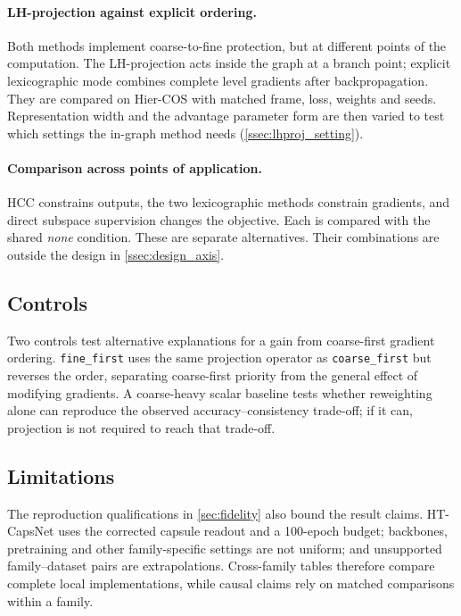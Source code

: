 \paragraph{LH-projection against explicit ordering.} Both methods implement
coarse-to-fine protection, but at different points of the computation. The
LH-projection acts inside the graph at a branch point; explicit lexicographic
mode combines complete level gradients after backpropagation. They are compared
on Hier-COS with matched frame, loss, weights and seeds. Representation width
and the advantage parameter form are then varied to test which settings the
in-graph method needs (\cref{ssec:lhproj_setting}).

\paragraph{Comparison across points of application.} HCC constrains outputs, the
two lexicographic methods constrain gradients, and direct subspace supervision
changes the objective. Each is compared with the shared \emph{none} condition.
These are separate alternatives. Their combinations are outside the design in
\cref{ssec:design_axis}.

\subsection{Controls}
\label{ssec:design_controls}

Two controls test alternative explanations for a gain from coarse-first
gradient ordering. \texttt{fine\_first} uses the same projection operator as
\texttt{coarse\_first} but reverses the order, separating coarse-first priority
from the general effect of modifying gradients. A coarse-heavy scalar baseline
tests whether reweighting alone can reproduce the observed
accuracy--consistency trade-off; if it can, projection is not required to reach
that trade-off.

\subsection{Limitations}
\label{ssec:design_threats}

The reproduction qualifications in \cref{sec:fidelity} also bound the result
claims. HT-CapsNet uses the corrected capsule readout and a 100-epoch budget;
backbones, pretraining and other family-specific settings are not uniform; and
unsupported family--dataset pairs are extrapolations. Cross-family tables
therefore compare complete local implementations, while causal claims rely on
matched comparisons within a family.

